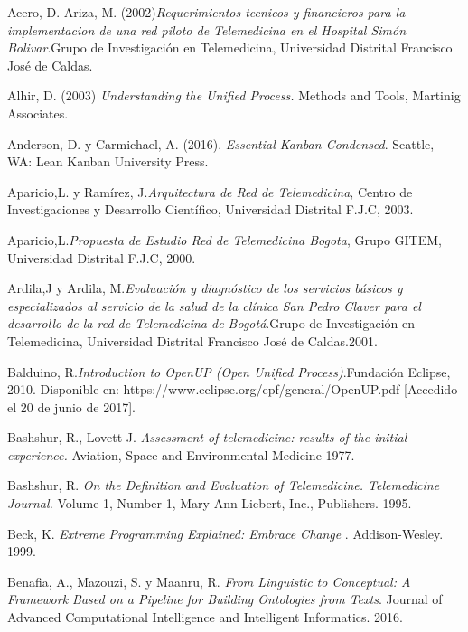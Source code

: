 \begin{thebibliography}{}

 Acero, D. Ariza, M. (2002)\textit{Requerimientos tecnicos y financieros para la implementacion de una red piloto de Telemedicina en el Hospital Simón Bolivar}.Grupo de Investigación en Telemedicina,  Universidad Distrital Francisco José de Caldas.

 Alhir, D. (2003) \textit{Understanding the Unified Process.} Methods and Tools, Martinig Associates.

 Anderson, D. y Carmichael, A. (2016). \textit{Essential Kanban Condensed}. Seattle, WA: Lean Kanban University Press.

 Aparicio,L. y Ramírez, J.\textit{Arquitectura de Red de Telemedicina}, Centro de Investigaciones y Desarrollo Científico, Universidad Distrital F.J.C, 2003.

 Aparicio,L.\textit{Propuesta de Estudio Red de Telemedicina Bogota}, Grupo GITEM, Universidad Distrital F.J.C, 2000.

 Ardila,J y Ardila, M.\textit{Evaluación y diagnóstico de los servicios básicos y especializados al servicio de la salud de la clínica San Pedro Claver para el desarrollo de la red de Telemedicina de Bogotá}.Grupo de Investigación en Telemedicina,  Universidad Distrital Francisco José de Caldas.2001.

 Balduino, R.\textit{Introduction to OpenUP (Open Unified Process)}.Fundación Eclipse, 2010. Disponible en: https://www.eclipse.org/epf/general/OpenUP.pdf [Accedido el 20 de junio de 2017].

 Bashshur, R., Lovett J. \textit{Assessment of telemedicine: results of the initial experience.} Aviation, Space and Environmental Medicine 1977.

 Bashshur, R. \textit{On the Definition and Evaluation of Telemedicine. Telemedicine Journal.} Volume 1, Number 1, Mary Ann Liebert, Inc., Publishers. 1995.

 Beck, K. \textit{ Extreme Programming Explained: Embrace Change }. Addison-Wesley. 1999.

 Benafia, A., Mazouzi, S. y Maanru, R. \textit{From Linguistic to Conceptual: A Framework Based on a Pipeline for Building Ontologies from Texts}. Journal of Advanced Computational Intelligence and Intelligent Informatics. 2016.


\end{thebibliography}
